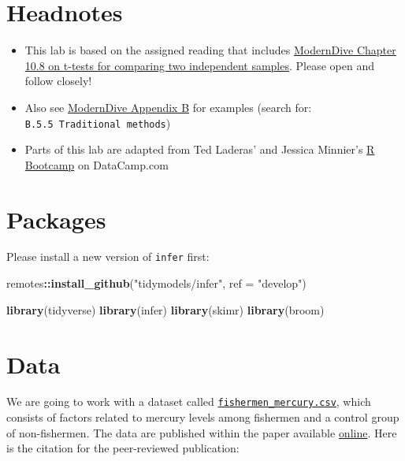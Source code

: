 \documentclass[]{article}
\newenvironment{Shaded}{\begin{snugshade}}{\end{snugshade}}
\newcommand{\KeywordTok}[1]{\textcolor[rgb]{0.13,0.29,0.53}{\textbf{#1}}}
\newcommand{\DataTypeTok}[1]{\textcolor[rgb]{0.13,0.29,0.53}{#1}}
\newcommand{\StringTok}[1]{\textcolor[rgb]{0.31,0.60,0.02}{#1}}
\newcommand{\OperatorTok}[1]{\textcolor[rgb]{0.81,0.36,0.00}{\textbf{#1}}}
\newcommand{\NormalTok}[1]{#1}
\providecommand{\tightlist}{%
  \setlength{\itemsep}{0pt}\setlength{\parskip}{0pt}}
\begin{document}
\section{Headnotes}\label{headnotes}

\begin{itemize}
\tightlist
\item
  This lab is based on the assigned reading that includes
  \href{http://moderndive.netlify.com/10-hypothesis-testing.html\#theory-hypo}{ModernDive
  Chapter 10.8 on t-tests for comparing two independent samples}. Please
  open and follow closely!
\item
  Also see \href{http://moderndive.netlify.com/b-appendixb}{ModernDive
  Appendix B} for examples (search for:
  \texttt{B.5.5\ Traditional\ methods})
\item
  Parts of this lab are adapted from Ted Laderas' and Jessica Minnier's
  \href{https://www.datacamp.com/courses/rbootcamp}{R Bootcamp} on
  DataCamp.com
\end{itemize}

\section{Packages}\label{packages}

Please install a new version of \texttt{infer} first:

\begin{Shaded}
\begin{Highlighting}[]
\NormalTok{remotes}\OperatorTok{::}\KeywordTok{install_github}\NormalTok{(}\StringTok{"tidymodels/infer"}\NormalTok{, }\DataTypeTok{ref =} \StringTok{"develop"}\NormalTok{)}
\end{Highlighting}
\end{Shaded}

\begin{Shaded}
\begin{Highlighting}[]
\KeywordTok{library}\NormalTok{(tidyverse)}
\KeywordTok{library}\NormalTok{(infer)}
\KeywordTok{library}\NormalTok{(skimr)}
\KeywordTok{library}\NormalTok{(broom)}
\end{Highlighting}
\end{Shaded}

\section{Data}\label{data}

We are going to work with a dataset called
\href{https://raw.githubusercontent.com/apreshill/ohsu-basic-stats/master/data/fishermen_mercury.csv}{\texttt{fishermen\_mercury.csv}},
which consists of factors related to mercury levels among fishermen and
a control group of non-fishermen. The data are published within the
paper available
\href{https://www.sciencedirect.com/science/article/pii/S0269749199002614?via\%3Dihub\#TBL2}{online}.
Here is the citation for the peer-reviewed publication:
\end{document}
